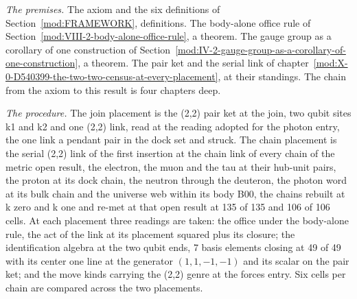 \begin{chproof}
\textit{The premises.} The axiom and the six definitions of Section~\ref{mod:FRAMEWORK}, definitions. The body-alone office rule of Section~\ref{mod:VIII-2-body-alone-office-rule}, a theorem. The gauge group as a corollary of one construction of Section~\ref{mod:IV-2-gauge-group-as-a-corollary-of-one-construction}, a theorem. The pair ket and the serial link of chapter~\ref{mod:X-0-D540399-the-two-two-census-at-every-placement}, at their standings. The chain from the axiom to this result is four chapters deep.

\textit{The procedure.} The join placement is the (2,2) pair ket at the join, two qubit sites k1 and k2 and one (2,2) link, read at the reading adopted for the photon entry, the one link a pendant pair in the dock set and struck. The chain placement is the serial (2,2) link of the first insertion at the chain link of every chain of the metric open result, the electron, the muon and the tau at their hub-unit pairs, the proton at its dock chain, the neutron through the deuteron, the photon word at its bulk chain and the universe web within its body B00, the chains rebuilt at k zero and k one and re-met at that open result at 135 of 135 and 106 of 106 cells. At each placement three readings are taken: the office under the body-alone rule, the act of the link at its placement squared plus its closure; the identification algebra at the two qubit ends, 7 basis elements closing at 49 of 49 with its center one line at the generator $(1, 1, -1, -1)$ and its scalar on the pair ket; and the move kinds carrying the (2,2) genre at the forces entry. Six cells per chain are compared across the two placements.


\end{chproof}
